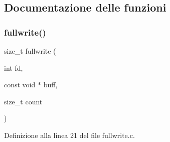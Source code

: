 \subsection{Documentazione delle funzioni}
\mbox{\label{a00011_a07a5975e70c72acac6fb5c1a8a6ce6d4}} 
\subsubsection{\texorpdfstring{fullwrite()}{fullwrite()}}
{\footnotesize\ttfamily size\+\_\+t fullwrite (\begin{DoxyParamCaption}\item[{int}]{fd,  }\item[{const void $\ast$}]{buff,  }\item[{size\+\_\+t}]{count }\end{DoxyParamCaption})}



Definizione alla linea 21 del file fullwrite.\+c.

